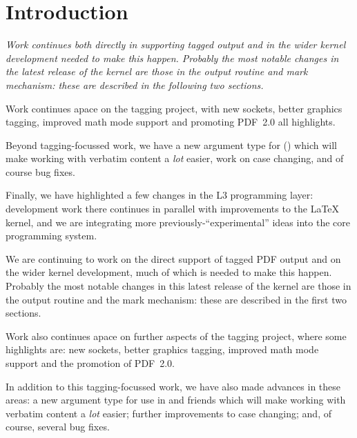 \documentclass{ltnews}
\newenvironment{old}{\par\itshape}{\par}  %
\begin{document}
\maketitle
{  \spaceskip=3.33pt 
\tableofcontents}

\setlength{}

\medskip

\section{Introduction}

\begin{old}
Work continues both directly in supporting tagged output and in the wider
kernel development needed to make this happen. Probably the most notable
changes in the latest release of the kernel are those in the output routine
and mark mechanism: these are described in the following two sections.

Work continues apace on the tagging project, with new sockets, better
graphics tagging, improved math mode support and promoting PDF~2.0
all highlights.

Beyond tagging-focussed work, we have a new argument type for
 () which will make working with verbatim
content a \emph{lot} easier, work on case changing, and of
course bug fixes.

Finally, we have highlighted a few changes in the L3 programming layer:
development work there continues in parallel with improvements to the \LaTeX{}
kernel, and we are integrating more previously-\enquote{experimental} ideas
into the core programming system.
\end{old}


We are continuing to work on the direct
support of tagged PDF output and on the wider
kernel development, much of which is needed to make this happen. 
Probably the most notable
changes in this latest release of the kernel are those in the output routine
and the mark mechanism: these are described in the first two sections.

Work also continues apace on further aspects of the tagging project, 
where some highlights are: new sockets, better
graphics tagging, improved math mode support and the promotion of PDF~2.0.

In addition to this tagging-focussed work, we have also made advances in these areas:
 a new argument type for use in  and friends
which will make working with verbatim
content a \emph{lot} easier; further improvements to case changing; and, of
course,
several
bug fixes.
\end{document}
